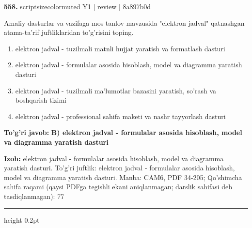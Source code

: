\documentclass[10pt,a4paper]{article}
\begin{document}
{\bfseries\sffamily\color{ink} 558.} {scriptsizecolor{muted} Y1 | review | 8a897b0d}
\par
Amaliy dasturlar va vazifaga mos tanlov mavzusida "elektron jadval" qatnashgan atama-ta'rif juftliklaridan to'g'risini toping.
\begin{enumerate}[label=\Alph*),leftmargin=9mm]
\item elektron jadval - tuzilmali matnli hujjat yaratish va formatlash dasturi
\item elektron jadval - formulalar asosida hisoblash, model va diagramma yaratish dasturi
\item elektron jadval - tuzilmali ma'lumotlar bazasini yaratish, so'rash va boshqarish tizimi
\item elektron jadval - professional sahifa maketi va nashr tayyorlash dasturi
\end{enumerate}
\begin{tcolorbox}[enhanced,breakable,colback=teal!4,colframe=teal!60!black,boxrule=0.45pt,arc=1.2mm,left=2.7mm,right=2.7mm,top=1.8mm,bottom=1.8mm,before skip=2mm,after skip=2mm]
{\bfseries\sffamily\color{teal}To'g'ri javob:} \textbf{B) elektron jadval - formulalar asosida hisoblash, model va diagramma yaratish dasturi}
\par\smallskip
{\bfseries Izoh:} elektron jadval - formulalar asosida hisoblash, model va diagramma yaratish dasturi. To'g'ri juftlik: elektron jadval - formulalar asosida hisoblash, model va diagramma yaratish dasturi. Manba: CAM6, PDF 34-205; Qo'shimcha sahifa raqami (qaysi PDFga tegishli ekani aniqlanmagan; darslik sahifasi deb tasdiqlanmagan): 77
\end{tcolorbox}
\vspace{2mm}\hrule height 0.2pt\vspace{3mm}
\end{document}
